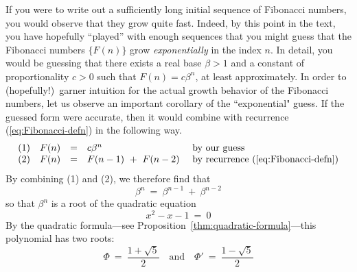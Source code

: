 \noindent {}

\bigskip 

If you were to write out a sufficiently long initial sequence of Fibonacci numbers, you would observe that they grow quite fast.  Indeed, by this point in the text, you have hopefully ``played'' with enough sequences that you might guess that the Fibonacci numbers $\{ F(n) \}$ grow {\em exponentially} in the index $n$.  In detail, you would be guessing that there exists a real base $\beta > 1$ and a constant of proportionality $c > 0$ such that $F(n) = c \beta^n$, at least approximately.  In order to (hopefully!)~garner intuition for the actual growth behavior of the Fibonacci numbers, let us observe an important corollary of the ``exponential" guess.  If the guessed form were accurate, then it would combine with recurrence (\ref{eq:Fibonacci-defn}) in the following way.
\[ \begin{array}{cccll}
(1) & F(n) & = & c \beta^n
      & \mbox{ by our guess} \\
(2) & F(n) & = & F(n-1) \ + \ F(n-2)
      & \mbox{ by recurrence (\ref{eq:Fibonacci-defn})}
\end{array}
\]
By combining (1) and (2), we therefore find that
\[ \beta^n \ = \ \beta^{n-1} \ + \ \beta^{n-2} \]
so that $\beta^n$ is a root of the quadratic equation
\[
x^2 - x - 1 \ = \ 0
\]
By the quadratic formula---see Proposition~\ref{thm:quadratic-formula}---this polynomial has two roots: 
\[ \Phi \ = \ {\displaystyle \frac{1+\sqrt{5}}{2}} \ \ \ \mbox{ and } \ \ \
\Phi' \ = \ {\displaystyle \frac{1-\sqrt{5}}{2}} \]


\smallskip

